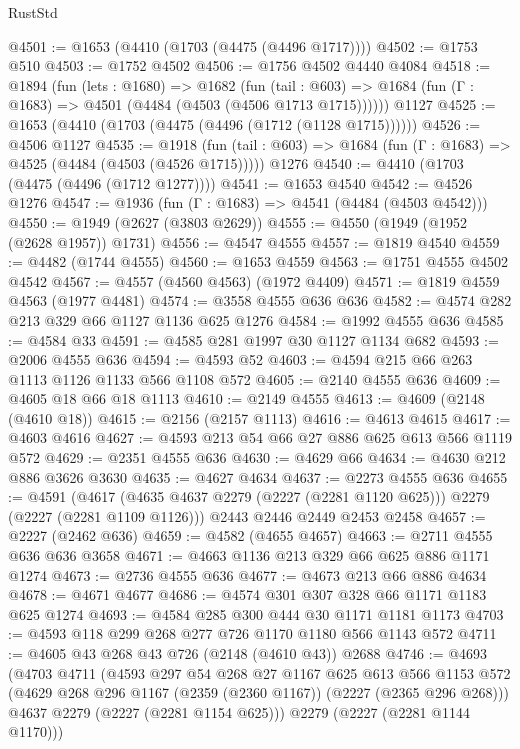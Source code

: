 \begin{lexlean}{RustStd}
\begin{coremodule}
@4501 := @1653 (@4410 (@1703 (@4475 (@4496 @1717))))
@4502 := @1753 @510
@4503 := @1752 @4502
@4506 := @1756 @4502 @4440 @4084
@4518 := @1894
    (fun (lets : @1680) =>
    @1682
      (fun (tail : @603) => @1684 (fun (Γ : @1683) => @4501 (@4484 (@4503 (@4506 @1713 @1715))))))
    @1127
@4525 := @1653 (@4410 (@1703 (@4475 (@4496 (@1712 (@1128 @1715))))))
@4526 := @4506 @1127
@4535 := @1918
    (fun (tail : @603) => @1684 (fun (Γ : @1683) => @4525 (@4484 (@4503 (@4526 @1715)))))
    @1276
@4540 := @4410 (@1703 (@4475 (@4496 (@1712 @1277))))
@4541 := @1653 @4540
@4542 := @4526 @1276
@4547 := @1936 (fun (Γ : @1683) => @4541 (@4484 (@4503 @4542)))
@4550 := @1949 (@2627 (@3803 @2629))
@4555 := @4550 (@1949 (@1952 (@2628 @1957)) @1731)
@4556 := @4547 @4555
@4557 := @1819 @4540
@4559 := @4482 (@1744 @4555)
@4560 := @1653 @4559
@4563 := @1751 @4555 @4502 @4542
@4567 := @4557 (@4560 @4563) (@1972 @4409)
@4571 := @1819 @4559 @4563 (@1977 @4481)
@4574 := @3558 @4555 @636 @636
@4582 := @4574 @282 @213 @329 @66 @1127 @1136 @625 @1276
@4584 := @1992 @4555 @636
@4585 := @4584 @33
@4591 := @4585 @281 @1997 @30 @1127 @1134 @682
@4593 := @2006 @4555 @636
@4594 := @4593 @52
@4603 := @4594 @215 @66 @263 @1113 @1126 @1133 @566 @1108 @572
@4605 := @2140 @4555 @636
@4609 := @4605 @18 @66 @18 @1113
@4610 := @2149 @4555
@4613 := @4609 (@2148 (@4610 @18))
@4615 := @2156 (@2157 @1113)
@4616 := @4613 @4615
@4617 := @4603 @4616
@4627 := @4593 @213 @54 @66 @27 @886 @625 @613 @566 @1119 @572
@4629 := @2351 @4555 @636
@4630 := @4629 @66
@4634 := @4630 @212 @886 @3626 @3630
@4635 := @4627 @4634
@4637 := @2273 @4555 @636
@4655 := @4591
    (@4617 (@4635 @4637 @2279 (@2227 (@2281 @1120 @625))) @2279 (@2227 (@2281 @1109 @1126)))
    @2443
    @2446
    @2449
    @2453
    @2458
@4657 := @2227 (@2462 @636)
@4659 := @4582 (@4655 @4657)
@4663 := @2711 @4555 @636 @636 @3658
@4671 := @4663 @1136 @213 @329 @66 @625 @886 @1171 @1274
@4673 := @2736 @4555 @636
@4677 := @4673 @213 @66 @886 @4634
@4678 := @4671 @4677
@4686 := @4574 @301 @307 @328 @66 @1171 @1183 @625 @1274
@4693 := @4584 @285 @300 @444 @30 @1171 @1181 @1173
@4703 := @4593 @118 @299 @268 @277 @726 @1170 @1180 @566 @1143 @572
@4711 := @4605 @43 @268 @43 @726 (@2148 (@4610 @43)) @2688
@4746 := @4693
    (@4703
      @4711
      (@4593
        @297
        @54
        @268
        @27
        @1167
        @625
        @613
        @566
        @1153
        @572
        (@4629 @268 @296 @1167 (@2359 (@2360 @1167)) (@2227 (@2365 @296 @268)))
        @4637
        @2279
        (@2227 (@2281 @1154 @625)))
      @2279
      (@2227 (@2281 @1144 @1170)))

\end{coremodule}
\end{lexlean}
